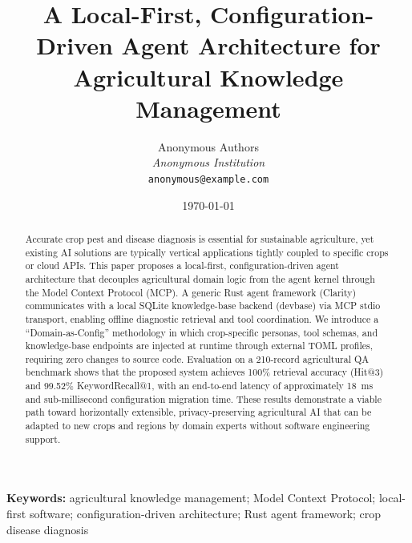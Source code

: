 \documentclass[11pt,a4paper]{article}
\title{A Local-First, Configuration-Driven Agent Architecture for Agricultural Knowledge Management}
\author{Anonymous Authors\\
        \textit{Anonymous Institution}\\
        \texttt{anonymous@example.com}}
\date{\today}
\begin{document}
\maketitle

\begin{abstract}
Accurate crop pest and disease diagnosis is essential for sustainable agriculture, yet existing AI solutions are typically vertical applications tightly coupled to specific crops or cloud APIs. This paper proposes a local-first, configuration-driven agent architecture that decouples agricultural domain logic from the agent kernel through the Model Context Protocol (MCP). A generic Rust agent framework (Clarity) communicates with a local SQLite knowledge-base backend (devbase) via MCP stdio transport, enabling offline diagnostic retrieval and tool coordination. We introduce a ``Domain-as-Config'' methodology in which crop-specific personas, tool schemas, and knowledge-base endpoints are injected at runtime through external TOML profiles, requiring zero changes to source code. Evaluation on a 210-record agricultural QA benchmark shows that the proposed system achieves 100\% retrieval accuracy (Hit@3) and 99.52\% KeywordRecall@1, with an end-to-end latency of approximately 18~ms and sub-millisecond configuration migration time. These results demonstrate a viable path toward horizontally extensible, privacy-preserving agricultural AI that can be adapted to new crops and regions by domain experts without software engineering support.
\end{abstract}

\textbf{Keywords:} agricultural knowledge management; Model Context Protocol; local-first software; configuration-driven architecture; Rust agent framework; crop disease diagnosis










\end{document}
